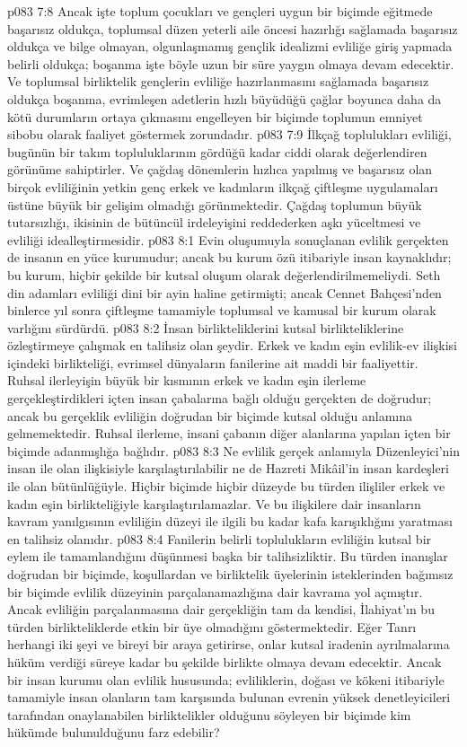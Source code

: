 \vs p083 7:8 Ancak işte toplum çocukları ve gençleri uygun bir biçimde eğitmede başarısız oldukça, toplumsal düzen yeterli aile öncesi hazırlığı sağlamada başarısız oldukça ve bilge olmayan, olgunlaşmamış gençlik idealizmi evliliğe giriş yapmada belirli oldukça; boşanma işte böyle uzun bir süre yaygın olmaya devam edecektir. Ve toplumsal birliktelik gençlerin evliliğe hazırlanmasını sağlamada başarısız oldukça boşanma, evrimleşen adetlerin hızlı büyüdüğü çağlar boyunca daha da kötü durumların ortaya çıkmasını engelleyen bir biçimde toplumun emniyet sibobu olarak faaliyet göstermek zorundadır.
\vs p083 7:9 İlkçağ toplulukları evliliği, bugünün bir takım topluluklarının gördüğü kadar ciddi olarak değerlendiren görünüme sahiptirler. Ve çağdaş dönemlerin hızlıca yapılmış ve başarısız olan birçok evliliğinin yetkin genç erkek ve kadınların ilkçağ çiftleşme uygulamaları üstüne büyük bir gelişim olmadığı görünmektedir. Çağdaş toplumun büyük tutarsızlığı, ikisinin de bütüncül irdeleyişini reddederken aşkı yüceltmesi ve evliliği idealleştirmesidir.
\vs p083 8:1 Evin oluşumuyla sonuçlanan evlilik gerçekten de insanın en yüce kurumudur; ancak bu kurum özü itibariyle insan kaynaklıdır; bu kurum, hiçbir şekilde bir kutsal oluşum olarak değerlendirilmemeliydi. Seth din adamları evliliği dini bir ayin haline getirmişti; ancak Cennet Bahçesi’nden binlerce yıl sonra çiftleşme tamamiyle toplumsal ve kamusal bir kurum olarak varlığını sürdürdü.
\vs p083 8:2 İnsan birlikteliklerini kutsal birlikteliklerine özleştirmeye çalışmak en talihsiz olan şeydir. Erkek ve kadın eşin evlilik\hyp{}ev ilişkisi içindeki birlikteliği, evrimsel dünyaların fanilerine ait maddi bir faaliyettir. Ruhsal ilerleyişin büyük bir kısmının erkek ve kadın eşin ilerleme gerçekleştirdikleri içten insan çabalarına bağlı olduğu gerçekten de doğrudur; ancak bu gerçeklik evliliğin doğrudan bir biçimde kutsal olduğu anlamına gelmemektedir. Ruhsal ilerleme, insani çabanın diğer alanlarına yapılan içten bir biçimde adanmışlığa bağlıdır.
\vs p083 8:3 Ne evlilik gerçek anlamıyla Düzenleyici’nin insan ile olan ilişkisiyle karşılaştırılabilir ne de Hazreti Mikâil’in insan kardeşleri ile olan bütünlüğüyle. Hiçbir biçimde hiçbir düzeyde bu türden ilişliler erkek ve kadın eşin birlikteliğiyle karşılaştırılamazlar. Ve bu ilişkilere dair insanların kavram yanılgısının evliliğin düzeyi ile ilgili bu kadar kafa karışıklığını yaratması en talihsiz olanıdır.
\vs p083 8:4 Fanilerin belirli toplulukların evliliğin kutsal bir eylem ile tamamlandığını düşünmesi başka bir talihsizliktir. Bu türden inanışlar doğrudan bir biçimde, koşullardan ve birliktelik üyelerinin isteklerinden bağımsız bir biçimde evlilik düzeyinin parçalanamazlığına dair kavrama yol açmıştır. Ancak evliliğin parçalanmasına dair gerçekliğin tam da kendisi, İlahiyat’ın bu türden birlikteliklerde etkin bir üye olmadığını göstermektedir. Eğer Tanrı herhangi iki şeyi ve bireyi bir araya getirirse, onlar kutsal iradenin ayrılmalarına hüküm verdiği süreye kadar bu şekilde birlikte olmaya devam edecektir. Ancak bir insan kurumu olan evlilik hususunda; evliliklerin, doğası ve kökeni itibariyle tamamiyle insan olanların tam karşısında bulunan evrenin yüksek denetleyicileri tarafından onaylanabilen birliktelikler olduğunu söyleyen bir biçimde kim hükümde bulunulduğunu farz edebilir?
